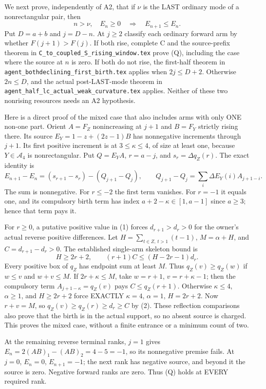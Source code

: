 We next prove, independently of A2, that if $\nu$ is the LAST
ordinary mode of a nonrectangular pair, then
\[
 n>\nu,\quad E_n\ge0\quad\Longrightarrow\quad E_{n+1}\le E_n.
 \tag{Q}
\]
Put $D=a+b$ and $j=D-n$. At $j\ge2$ classify each ordinary forward
arm by whether $F(j+1)>F(j)$.
If both rise, complete C and the source-prefix theorem in
\texttt{C\_to\_coupled\_S\_rising\_window.tex} prove (Q), including
the case where the source at $n$ is zero. If both do not rise,
the first-half theorem in \texttt{agent\_bothdeclining\_first\_birth.tex}
applies when $2j\le D+2$. Otherwise $2n\le D$, and the actual
post-LAST-mode theorem in
\texttt{agent\_half\_lc\_actual\_weak\_curvature.tex} applies.
Neither of these two nonrising resources needs an A2 hypothesis.

Here is a direct proof of the mixed case that also includes arms
with only ONE non-one part. Orient $A=F_Z$ nonincreasing at $j+1$
and $B=F_Y$ strictly rising there. Its source
$E_Y=1-z+(2z-1)B$ has nonnegative increments through $j+1$.
Its first positive increment is at $3\le\kappa\le4$, of size at least
one, because $Y\in\mathcal A_4$ is nonrectangular.
Put $Q=E_YA$, $r=a-j$, and $s_r=\Delta q_Z(r)$. The exact identity is
\[
 E_{n+1}-E_n=(s_{r+1}-s_r)-(Q_{j+1}-Q_j),\qquad
 Q_{j+1}-Q_j=\sum_i\Delta E_Y(i) A_{j+1-i}.       \tag{1}
\]
The sum is nonnegative. For $r\le-2$ the first term vanishes.
For $r=-1$ it equals one, and its compulsory birth term has
index $a+2-\kappa\in[1,a-1]$ since $a\ge3$; hence that term pays it.

For $r\ge0$, a putative positive value in (1) forces
$d_{r+1}>d_r>0$ for the owner's actual reverse positive differences.
Let $H=\sum_{t\in Z,\ t>1}(t-1)$, $M=\alpha+H$, and
$C=d_{r+1}-d_r>0$. The established single-arm skeleton bound is
\[
 H\ge2r+2,\qquad (r+1)C\le(H-2r-1)d_r.           \tag{2}
\]
Every positive box of $q_Z$ has endpoint sum at least $M$.
Thus $q_Z(v)\ge q_Z(w)$ if $w\le v$ and $w+v\le M$.
If $2r+\kappa\le M$, take $w=r+1$, $v=r+\kappa-1$;
then the compulsory term $A_{j+1-\kappa}=q_Z(v)$ pays
$C\le q_Z(r+1)$.
Otherwise $\kappa\le4$, $\alpha\ge1$, and $H\ge2r+2$
force EXACTLY $\kappa=4$, $\alpha=1$, $H=2r+2$.
Now $r+v=M$, so $q_Z(v)\ge q_Z(r)\ge d_r\ge C$ by (2).
These reflection comparisons also prove that the birth is in the
actual support, so no absent source is charged. This proves the
mixed case, without a finite entrance or a minimum count of two.

At the remaining reverse terminal ranks, $j=1$ gives
$E_n=2(AB)_1-(AB)_2=4-5=-1$, so its nonnegative premise fails.
At $j=0$, $E_n=0$, $E_{n+1}=-1$; the next rank has negative source,
and beyond it the source is zero. Negative forward ranks are zero.
Thus (Q) holds at EVERY required rank.

